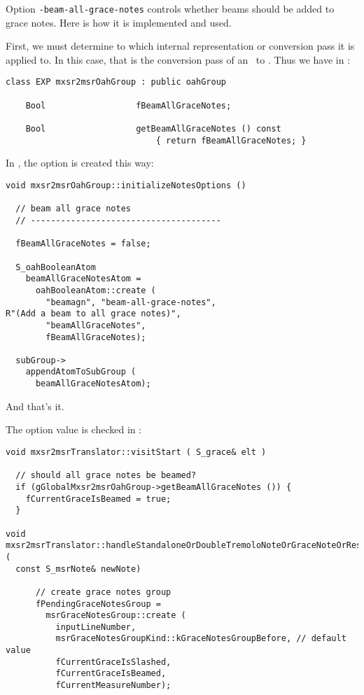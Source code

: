 {Option {\tt -beam-all-grace-notes} controls whether beams should be added to grace notes. Here is how it is implemented and used.

First, we must determine to which internal representation or conversion pass it is applied to. In this case, that is the conversion pass of an \mxsrRepr\ to \msrRepr.
Thus we have in :
\begin{lstlisting}[language=CPlusPlus]
class EXP mxsr2msrOahGroup : public oahGroup

    Bool                  fBeamAllGraceNotes;

    Bool                  getBeamAllGraceNotes () const
                              { return fBeamAllGraceNotes; }
\end{lstlisting}

In , the option is created this way:
\begin{lstlisting}[language=CPlusPlus]
void mxsr2msrOahGroup::initializeNotesOptions ()

  // beam all grace notes
  // --------------------------------------

  fBeamAllGraceNotes = false;

  S_oahBooleanAtom
    beamAllGraceNotesAtom =
      oahBooleanAtom::create (
        "beamagn", "beam-all-grace-notes",
R"(Add a beam to all grace notes)",
        "beamAllGraceNotes",
        fBeamAllGraceNotes);

  subGroup->
    appendAtomToSubGroup (
      beamAllGraceNotesAtom);
\end{lstlisting}

And that's it.

The option value is checked in :
\begin{lstlisting}[language=CPlusPlus]
void mxsr2msrTranslator::visitStart ( S_grace& elt )

  // should all grace notes be beamed?
  if (gGlobalMxsr2msrOahGroup->getBeamAllGraceNotes ()) {
    fCurrentGraceIsBeamed = true;
  }

void mxsr2msrTranslator::handleStandaloneOrDoubleTremoloNoteOrGraceNoteOrRest (
  const S_msrNote& newNote)

      // create grace notes group
      fPendingGraceNotesGroup =
        msrGraceNotesGroup::create (
          inputLineNumber,
          msrGraceNotesGroupKind::kGraceNotesGroupBefore, // default value
          fCurrentGraceIsSlashed,
          fCurrentGraceIsBeamed,
          fCurrentMeasureNumber);


\end{lstlisting}}
